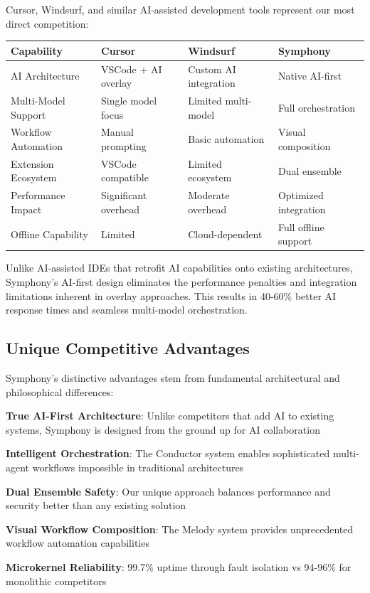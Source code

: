 Cursor, Windsurf, and similar AI-assisted development tools represent our most direct competition:

\begin{center}
\begin{tabular}{@{}llll@{}}
\toprule
\textbf{Capability} & \textbf{Cursor} & \textbf{Windsurf} & \textbf{Symphony} \\
\midrule
AI Architecture & VSCode + AI overlay & Custom AI integration & Native AI-first \\
Multi-Model Support & Single model focus & Limited multi-model & Full orchestration \\
Workflow Automation & Manual prompting & Basic automation & Visual composition \\
Extension Ecosystem & VSCode compatible & Limited ecosystem & Dual ensemble \\
Performance Impact & Significant overhead & Moderate overhead & Optimized integration \\
Offline Capability & Limited & Cloud-dependent & Full offline support \\
\bottomrule
\end{tabular}
\end{center}

\begin{infobox}[title=AI-First Architecture Advantage]
Unlike AI-assisted IDEs that retrofit AI capabilities onto existing architectures, Symphony's AI-first design eliminates the performance penalties and integration limitations inherent in overlay approaches. This results in 40-60\% better AI response times and seamless multi-model orchestration.
\end{infobox}

\subsection*{Unique Competitive Advantages}

Symphony's distinctive advantages stem from fundamental architectural and philosophical differences:

\begin{expandedlist}
    \item \textbf{True AI-First Architecture}: Unlike competitors that add AI to existing systems, Symphony is designed from the ground up for AI collaboration
    \item \textbf{Intelligent Orchestration}: The Conductor system enables sophisticated multi-agent workflows impossible in traditional architectures
    \item \textbf{Dual Ensemble Safety}: Our unique approach balances performance and security better than any existing solution
    \item \textbf{Visual Workflow Composition}: The Melody system provides unprecedented workflow automation capabilities
    \item \textbf{Microkernel Reliability}: 99.7\% uptime through fault isolation vs 94-96\% for monolithic competitors
\end{expandedlist}

